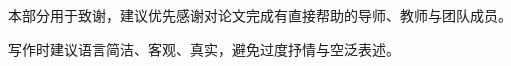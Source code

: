 \begin{acknowledgement}
本部分用于致谢，建议优先感谢对论文完成有直接帮助的导师、教师与团队成员。

写作时建议语言简洁、客观、真实，避免过度抒情与空泛表述。
\end{acknowledgement}
